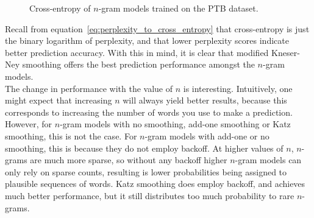 \documentclass[a4paper, 12pt]{report}
\begin{document}
\begin{figure}[h]
\caption{Cross-entropy of $n$-gram models trained on the PTB dataset.}
\end{figure}

Recall from equation~\ref{eq:perplexity_to_cross_entropy} that cross-entropy is just the binary logarithm of perplexity, and that lower perplexity scores indicate better prediction accuracy. With this in mind, it is clear that modified Kneser-Ney smoothing offers the best prediction performance amongst the $n$-gram models. \\

The change in performance with the value of $n$ is interesting. Intuitively, one might expect that increasing $n$ will always yield better results, because this corresponds to increasing the number of words you use to make a prediction. However, for $n$-gram models with no smoothing, add-one smoothing or Katz smoothing, this is not the case. For $n$-gram models with add-one or no smoothing, this is because they do not employ backoff. At higher values of $n$, $n$-grams are much more sparse, so without any backoff higher $n$-gram models can only rely on sparse counts, resulting is lower probabilities being assigned to plausible sequences of words. Katz smoothing does employ backoff, and achieves much better performance, but it still distributes too much probability to rare $n$-grams.
\end{document}
